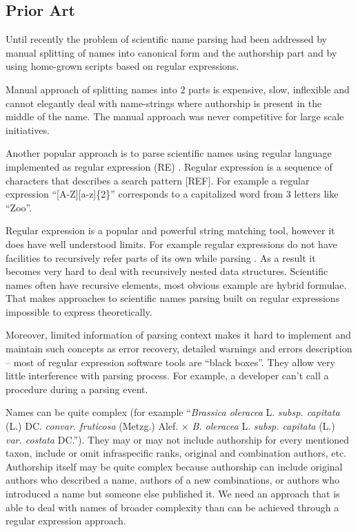\documentclass{bmcart}
\begin{document}
\subsection*{Prior Art}

Until recently the problem of scientific name parsing had been addressed by
manual splitting of names into canonical form and the authorship part and
by using home-grown scripts based on regular expressions.

Manual approach of splitting names into 2 parts is expensive, slow, inflexible
and cannot elegantly deal with name-strings where authorship is present in the
middle of the name. The manual approach was never competitive for large scale
initiatives.

Another popular approach is to parse scientific names using regular language
implemented as regular expression (RE) \cite{aho1992foundations}. Regular
expression is a sequence of characters that describes a search pattern [REF].
For example a regular expression ``[A-Z][a-z]\{2\}'' corresponds to a
capitalized word from 3 letters like ``Zoo''.

Regular expression is a popular and powerful string matching tool, however
it does have well understood limits. For example regular expressions do not
have facilities to recursively refer parts of its own while parsing
\cite{yu1997handbook}. As a result it becomes very hard to deal with
recursively nested data structures.  Scientific names often have recursive
elements, most obvious example are hybrid formulae.  That makes approaches to
scientific names parsing built on regular expressions impossible to express
theoretically.

Moreover, limited information of parsing context makes it hard to
implement and maintain such concepts as error recovery, detailed warnings and
errors description -- most of regular expression software tools are ``black
boxes''. They allow very little interference with parsing process. For example,
a developer can't call a procedure during a parsing event.

Names can be quite complex (for example ``\textit{Brassica oleracea} L.
\textit{subsp.  capitata} (L.) DC. \textit{convar. fruticosa} (Metzg.) Alef.
$\times$ \textit{B. oleracea} L. \textit{subsp. capitata} (L.) \textit{var.
costata} DC.''). They may or may not include authorship for every mentioned
taxon, include or omit infraspecific ranks, original and combination authors,
etc. Authorship itself may be  quite complex because authorship can include
original authors who described a name, authors of a new combinations, or
authors who introduced a name but someone else published it. We  need an
approach that is able to deal with names of broader complexity than can
be achieved through a regular expression approach.
\end{document}
